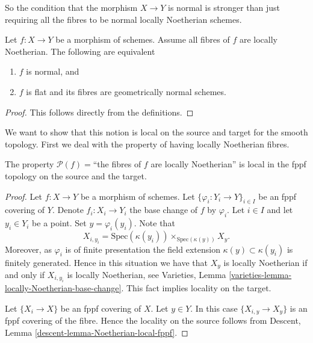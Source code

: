 \noindent
So the condition that the morphism $X \to Y$ is normal
is stronger than just requiring all
the fibres to be normal locally Noetherian schemes.

\begin{lemma}
\label{lemma-normal}
Let $f : X \to Y$ be a morphism of schemes.
Assume all fibres of $f$ are locally Noetherian.
The following are equivalent
\begin{enumerate}
\item $f$ is normal, and
\item $f$ is flat and its fibres are geometrically normal schemes.
\end{enumerate}
\end{lemma}

\begin{proof}
This follows directly from the definitions.
\end{proof}

\noindent
We want to show that this notion is local on the source and target
for the smooth topology. First we deal with the property of having
locally Noetherian fibres.

\begin{lemma}
\label{lemma-locally-Noetherian-fibres-fppf-local-source-and-target}
The property $\mathcal{P}(f)=$``the fibres of $f$ are locally Noetherian''
is local in the fppf topology on the source and the target.
\end{lemma}

\begin{proof}
Let $f : X \to Y$ be a morphism of schemes.
Let $\{\varphi_i : Y_i \to Y\}_{i \in I}$ be an fppf covering of $Y$.
Denote $f_i : X_i \to Y_i$ the base change of $f$ by $\varphi_i$.
Let $i \in I$ and let $y_i \in Y_i$ be a point.
Set $y = \varphi_i(y_i)$. Note that
$$
X_{i, y_i} = \text{Spec}(\kappa(y_i)) \times_{\text{Spec}(\kappa(y))} X_y.
$$
Moreover, as $\varphi_i$ is of finite presentation the field extension
$\kappa(y) \subset \kappa(y_i)$ is finitely generated.
Hence in this situation we have that $X_y$ is locally Noetherian if and
only if $X_{i, y_i}$ is locally Noetherian, see
Varieties, Lemma \ref{varieties-lemma-locally-Noetherian-base-change}.
This fact implies locality on the target.

\medskip\noindent
Let $\{X_i \to X\}$ be an fppf covering of $X$.
Let $y \in Y$. In this case $\{X_{i, y} \to X_y\}$ is an
fppf covering of the fibre. Hence the locality on the source
follows from Descent, Lemma \ref{descent-lemma-Noetherian-local-fppf}.
\end{proof}

